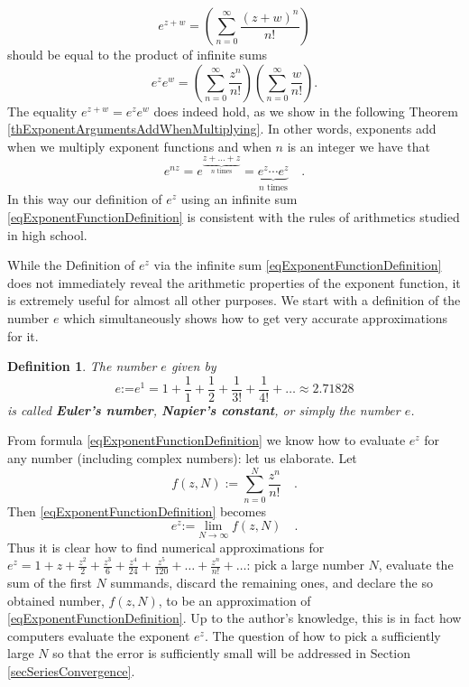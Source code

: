 \documentclass[12pt]{book}
\newcommand{\eqdef}{\textbf{:=}}
\newtheorem{definition}[theorem]{Definition}
\renewcommand{\emph}{\textbf}
\begin{document}
\[
e^{z+w} =\left(\sum\limits_{n=0}^{\infty} \frac{(z+w)^n}{n!}\right)
\]
should be equal to the product of infinite sums
\[
e^{z} e^w=\left(\sum\limits_{n=0}^{\infty} \frac{z^n}{n!}\right)\left(\sum\limits_{n=0}^{\infty} \frac{w}{n!} \right) .
\]
The equality $e^{z+w}= e^{z}e^{w}$ does indeed hold, as we show in the following Theorem \ref{thExponentArgumentsAddWhenMultiplying}. In other words, exponents add when we multiply exponent functions and when $n$ is an integer we have that
\begin{equation}\label{eqExponentToIntegerPowerRespectsArithmetics}
e^{n z}= e^{\underbrace{z+\dots +z}_{n\text{ times}} }=\underbrace{ e^{z}\cdots  e^{z}}_{n \text{ times}}  \quad .
\end{equation}
In this way our definition of  $e^{z}$ using an infinite sum \eqref{eqExponentFunctionDefinition} is consistent with the rules of arithmetics studied in high school.

While the Definition of $e^z$ via the infinite sum \eqref{eqExponentFunctionDefinition} does not immediately reveal the arithmetic properties of the exponent function, it is extremely useful for almost all other purposes. We start with a definition of the number $e$ which simultaneously shows how to get very accurate approximations for it.
\begin{definition}\label{defE} 
The number $e$ given by
\[
e\eqdef e^1= 1+ \frac{1}{1} +\frac{1}2 +\frac{1}{3!} +\frac{1}{4!}+\dots \approx 2.71828
\]
is called \emph{Euler's number}, \emph{Napier's constant}, or simply the number $e$.
\end{definition}
From formula \eqref{eqExponentFunctionDefinition} we know how to evaluate $e^z$ for any number (including complex numbers): let us elaborate. Let
\begin{equation}\label{eqExponentSeriesLimit}
\displaystyle f(z,N):=\sum\limits_{n=0}^{N} \frac{z^n}{n!}\quad .
\end{equation}
Then \eqref{eqExponentFunctionDefinition} becomes
\[
e^z\eqdef \displaystyle\lim\limits_{N\to \infty} f(z, N)\quad .
\]
Thus it is clear how to find numerical approximations for $e^z= 1+z+\frac{z^{2}}{2} +\frac{z^3}{6} +\frac{z^4}{24} +\frac{z^5}{120} +\dots+\frac{z^n}{n!}+\dots$: pick a large number $N$, evaluate the sum of the first $N$ summands, discard the remaining ones, and declare the so obtained number, $f(z,N)$, to be an approximation of \eqref{eqExponentFunctionDefinition}. Up to the author's knowledge, this is in fact how computers evaluate the exponent $e^z$. The question of how to pick a sufficiently large $N$ so that the error is sufficiently small will be addressed in Section \ref{secSeriesConvergence}.
\end{document}

